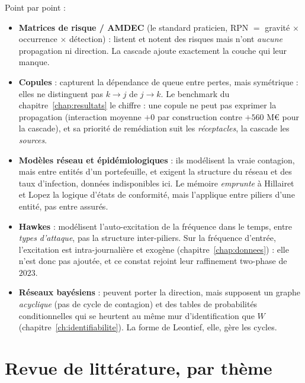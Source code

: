 \vspace{2pt}
Point par point :
\begin{itemize}\itemsep2pt
\item \textbf{Matrices de risque / AMDEC} (le standard praticien, RPN $=$ gravité $\times$
      occurrence $\times$ détection) : listent et notent des risques mais n'ont \emph{aucune}
      propagation ni direction. La cascade ajoute exactement la couche qui leur manque.
\item \textbf{Copules} \citep{BohmeKataria2006, HerathHerath2011} : capturent la
      dépendance de queue entre pertes, mais symétrique : elles ne distinguent pas
      $k\to j$ de $j\to k$. Le benchmark du chapitre~\ref{chap:resultats} le chiffre : une copule ne peut pas
      exprimer la propagation (interaction moyenne $+0$ par construction contre $+560$ M\euro{}
      pour la cascade), et sa priorité de remédiation suit les \emph{réceptacles}, la cascade
      les \emph{sources}.
\item \textbf{Modèles réseau et épidémiologiques} \citep{HillairetLopez2021,
      HillairetLopezDOultremontSpoorenberg2022, XuHua2017, Baldwin2017} : ils modélisent la
      vraie contagion, mais entre
      entités d'un portefeuille, et exigent la structure du réseau et des taux
      d'infection, données indisponibles ici. Le mémoire \emph{emprunte} à Hillairet et Lopez la
      logique d'états de conformité, mais l'applique entre piliers d'une entité,
      pas entre assurés.
\item \textbf{Hawkes} \citep{BessyRolandBoumezouedHillairet2021, BoumezouedCherkaouiHillairet2023} :
      modélisent l'auto-excitation de la fréquence dans le temps,
      entre \emph{types d'attaque}, pas la structure inter-piliers. Sur la fréquence d'entrée,
      l'excitation est intra-journalière et exogène (chapitre~\ref{chap:donnees}) : elle n'est
      donc pas ajoutée, et ce constat rejoint leur raffinement two-phase de $2023$.
\item \textbf{Réseaux bayésiens} : peuvent porter la direction, mais supposent un graphe
      \emph{acyclique} (pas de cycle de contagion) et des tables de probabilités
      conditionnelles qui se heurtent au même mur d'identification que $W$
      (chapitre~\ref{ch:identifiabilite}). La forme de Leontief, elle, gère les cycles.
\end{itemize}

\section{Revue de littérature, par thème}

